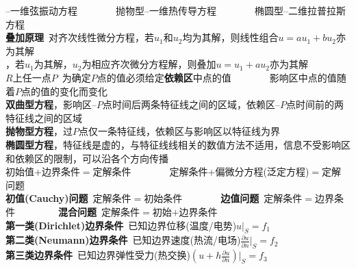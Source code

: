 \documentclass[10pt,a4paper]{article}
\begin{document}
\begin{multicols}{2}
--一维弦振动方程~~~~~~~~抛物型--一维热传导方程~~~~~~~~椭圆型--二维拉普拉斯方程\\
\textbf{叠加原理}~对齐次线性微分方程，若$u_1$和$u_2$均为其解，则线性组合$u=au_1+bu_2$亦为其解\\
，若$u_1$为其解，$u_2$为相应齐次微分方程解，则叠加$u=u_1+au_2$亦为其解\scriptsize\\
$R$上任一点$P$~为确定$P$点的值必须给定\textbf{依赖区}中点的值~~~~~~~~{影响区}中点的值随着$P$点的值的变化而变化\\
\textbf{双曲型方程}，影响区--$P$点时间后两条特征线之间的区域，依赖区--$P$点时间前的两特征线之间的区域\\
\textbf{抛物型方程}，过$P$点仅一条特征线，依赖区与影响区以特征线为界\\
\textbf{椭圆型方程}，特征线是虚的，与特征线线相关的数值方法不适用，信息不受影响区和依赖区的限制，可以沿各个方向传播\\
初始值$+$边界条件$=$定解条件~~~~~~~~定解条件$+$偏微分方程(泛定方程)$=$定解问题\\
\textbf{初值(Cauchy)问题}~定解条件$=$初始条件~~~~~~~~\textbf{边值问题}~定解条件$=$边界条件~~~~~~~~~\textbf{混合问题}~定解条件$=$初始$+$边界条件\\
\textbf{第一类(Dirichlet)边界条件}~已知边界位移(温度/电势)$u|_S=f_1$\\
\textbf{第二类(Neumann)边界条件}~已知边界速度(热流/电场)$\frac{\partial u}{\partial n}|_S=f_2$\\
\textbf{第三类边界条件}~已知边界弹性受力(热交换)$(u+h\frac{\partial u}{\partial n})|_S=f_3$\scriptsize
\end{multicols}
\end{document}

